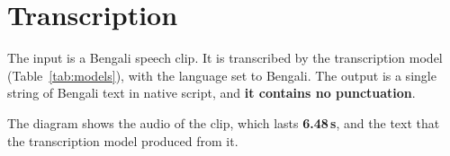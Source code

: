 \section{Transcription}

The input is a Bengali speech clip. It is transcribed by the transcription model (Table~\ref{tab:models}), with the language set to Bengali. The output is a single string of Bengali text in native script, and \textbf{it contains no punctuation}.

\begin{example}[: transcription]
The diagram shows the audio of the clip, which lasts \textbf{6.48\,s}, and the text that the transcription model produced from it.

\begin{center}

\end{center}

\end{example}
